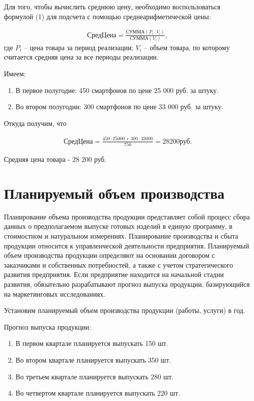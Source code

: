 Для того, чтобы вычислить среднюю цену, необходимо воспользоваться
формулой (1) для подсчета с помощью среднеарифметической цены:

\begin{align}
\text{СредЦена} = \frac{\text{СУММА} (P_i \cdot V_i)}{\text{СУММА}(V_i)},
\end{align} где $P_i$ – цена товара за период реализации; $V_i$ – объем товара, по которому
считается средняя цена за все периоды реализации.

Имеем:
\begin{enumerate}
	\item В первое полугодие: 450 смартфонов по цене 25 000 руб. за штуку.
	\item Во втором полугодии: 300 смартфонов по цене 33 000 руб. за штуку.
\end{enumerate}

Откуда получим, что

\begin{align}
\text{СредЦена} = \frac{450 \cdot 25 000+300 \cdot 33 000}{750} = 28 200 \text{руб}.
\end{align}

Средняя цена товара - 28 200 руб.

\newpage
\section*{Планируемый объем производства}

Планирование объема производства продукции представляет собой процесс
сбора данных о предполагаемом выпуске готовых изделий в единую
программу, в стоимостном и натуральном измерениях. Планирование
производства и сбыта продукции относится к управленческой деятельности
предприятия. Планируемый объем производства продукции определяют на
основании договором с заказчиками и собственных потребностей, а также с
учетом стратегического развития предприятия. Если предприятие находится на
начальной стадии развития, обязательно разрабатывают прогноз выпуска
продукции, базирующийся на маркетинговых исследованиях.

Установим планируемый объем производства продукции (работы, услуги) в год.

Прогноз выпуска продукции:
\begin{enumerate}
	\item В первом квартале планируется выпускать 150 шт.
\item  Во втором квартале планируется выпускать 350 шт.
\item Во третьем квартале планируется выпускать 280 шт.
\item Во четвертом квартале планируется выпускать 220 шт.
\end{enumerate}

